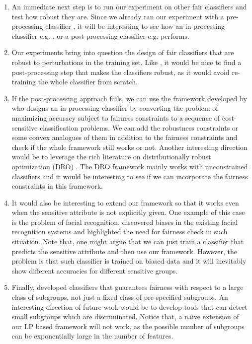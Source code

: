 \documentclass[11pt]{article}
\renewcommand{\cite}{\parencite}
\begin{document}
\begin{enumerate}
    \item An immediate next step is to run our experiment on other fair classifiers and test how robust they are. Since we already ran our experiment with a pre-processing classifier \cite{CWVN+17}, it will be interesting to see how an in-processing classifier e.g. \cite{ABDL+18}, or a post-processing classifier e.g. \cite{HPS16} performs.
    \item Our experiments bring into question the design of fair classifiers that are robust to perturbations in the training set. Like \citet{HPS16}, it would be nice to find a post-processing step that makes the classifiers robust, as it would avoid re-training the whole classifier from scratch. 
    \item If the post-processing approach fails, we can use the framework developed by \citet{ABDL+18} who designs an in-processing classifier by converting the problem of maximizing accuracy subject to fairness constraints to a sequence of cost-sensitive classification problems. We can add the robustness constraints or some convex analogues of them in addition to the fairness constraints and check if the whole framework still works or not. Another interesting direction would be to leverage the rich literature on distributionally robust optimization (DRO) \cite{ND16}. The DRO framework mainly works with unconstrained classifiers and it would be interesting to see if we can incorporate the fairness constraints in this framework.
    \item It would also be interesting to extend our framework so that it works even when the sensitive attribute is not explicitly given. One example of this case is the problem of facial recognition. \citet{BG18} discovered biases in the existing facial recognition systems and highlighted the need for fairness check in such situation. Note that, one might argue that we can just train a classifier that predicts the sensitive attribute and then use our framework. However, the problem is that such classifier is trained on biased data and it will inevitably show different accuracies for different sensitive groups.
    \item Finally, \citet{KNRZ17} developed classifiers that guarantees fairness with respect to a large class of subgroups, not just a fixed class of pre-specified subgroups. An interesting direction of future work would be to develop tools that can detect small subgroups which are discriminated. Notice that, a naive extension of our LP based framework will not work, as the possible number of subgroups can be exponentially large in the number of features.
\end{enumerate}
\end{document}
